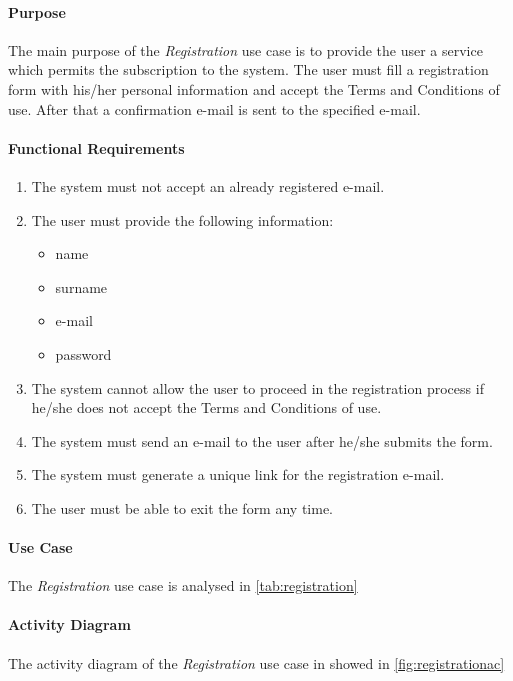 \paragraph*{Purpose\\}
The main purpose of the \emph{Registration} use case is to provide the user a service which permits the subscription to the system. The user must fill a registration form with his/her personal information and accept the Terms and Conditions of use. After that a confirmation e-mail is sent to the specified e-mail.
\paragraph{Functional Requirements}
\begin{enumerate}[label=R.\arabic*:]
	\item The system must not accept an already registered e-mail.
	\item The user must provide the following information:
	\begin{itemize}
		\item name
		\item surname
		\item e-mail
		\item password
	\end{itemize}
	\item The system cannot allow the user to proceed in the registration process if he/she does not accept the Terms and Conditions of use.
	\item The system must send an e-mail to the user after he/she submits the form.	
	\item The system must generate a unique link for the registration e-mail.
	\item The user must be able to exit the form any time.
\end{enumerate}

\paragraph*{Use Case\\}
The \emph{Registration} use case is analysed in \autoref{tab:registration}
\paragraph*{Activity Diagram\\}
The activity diagram of the \emph{Registration} use case in showed in \autoref{fig:registrationac}
